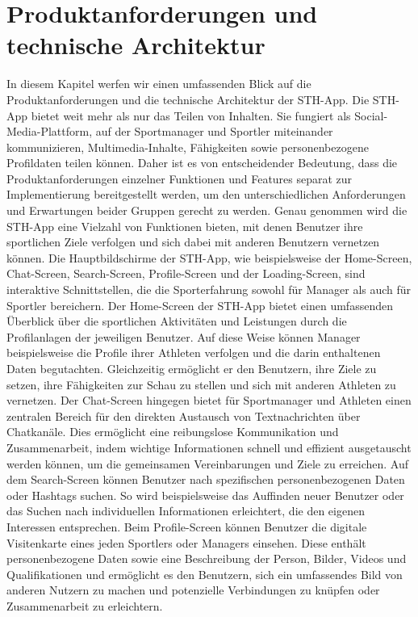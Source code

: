 \newpage
\chapter{Produktanforderungen und technische Architektur}

In diesem Kapitel werfen wir einen umfassenden Blick auf die Produktanforderungen und die technische Architektur der STH-App.
Die STH-App bietet weit mehr als nur das Teilen von Inhalten. Sie fungiert als Social-Media-Plattform, auf der Sportmanager und Sportler miteinander kommunizieren, Multimedia-Inhalte, Fähigkeiten sowie personenbezogene Profildaten teilen können. Daher ist es von entscheidender Bedeutung, dass die Produktanforderungen einzelner Funktionen und Features separat zur Implementierung bereitgestellt werden, um den unterschiedlichen Anforderungen und Erwartungen beider Gruppen gerecht zu werden.
Genau genommen wird die STH-App eine Vielzahl von Funktionen bieten, mit denen Benutzer ihre sportlichen Ziele verfolgen und sich dabei mit anderen Benutzern vernetzen können.
Die Hauptbildschirme der STH-App, wie beispielsweise der Home-Screen, Chat-Screen, Search-Screen, Profile-Screen und der Loading-Screen, sind interaktive Schnittstellen, die die Sporterfahrung sowohl für Manager als auch für Sportler bereichern.
Der Home-Screen der STH-App bietet einen umfassenden Überblick über die sportlichen Aktivitäten und Leistungen durch die Profilanlagen der jeweiligen Benutzer. Auf diese Weise können Manager beispielsweise die Profile ihrer Athleten verfolgen und die darin enthaltenen Daten begutachten. Gleichzeitig ermöglicht er den Benutzern, ihre Ziele zu setzen, ihre Fähigkeiten zur Schau zu stellen und sich mit anderen Athleten zu vernetzen.
Der Chat-Screen hingegen bietet für Sportmanager und Athleten einen zentralen Bereich für den direkten Austausch von Textnachrichten über Chatkanäle. Dies ermöglicht eine reibungslose Kommunikation und Zusammenarbeit, indem wichtige Informationen schnell und effizient ausgetauscht werden können, um die gemeinsamen Vereinbarungen und Ziele zu erreichen.
Auf dem Search-Screen können Benutzer nach spezifischen personenbezogenen Daten oder Hashtags suchen. So wird beispielsweise das Auffinden neuer Benutzer oder das Suchen nach individuellen Informationen erleichtert, die den eigenen Interessen entsprechen.
Beim Profile-Screen können Benutzer die digitale Visitenkarte eines jeden Sportlers oder Managers einsehen. Diese enthält personenbezogene Daten sowie eine Beschreibung der Person, Bilder, Videos und Qualifikationen und ermöglicht es den Benutzern, sich ein umfassendes Bild von anderen Nutzern zu machen und potenzielle Verbindungen zu knüpfen oder Zusammenarbeit zu erleichtern.
